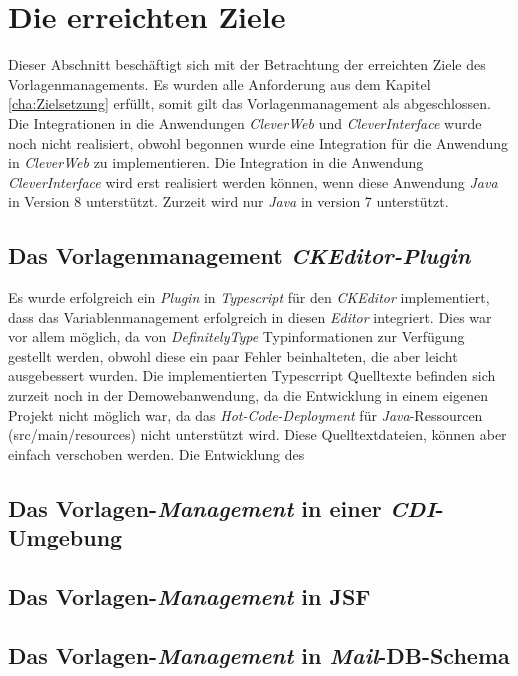 \section{Die erreichten Ziele}
Dieser Abschnitt beschäftigt sich mit der Betrachtung der erreichten Ziele des Vorlagenmanagements. Es wurden alle Anforderung aus dem Kapitel \ref{cha:Zielsetzung} erfüllt, somit gilt das Vorlagenmanagement als abgeschlossen. Die Integrationen in die Anwendungen \emph{CleverWeb} und \emph{CleverInterface} wurde noch nicht realisiert, obwohl begonnen wurde eine Integration für die Anwendung in \emph{CleverWeb} zu implementieren. Die Integration in die Anwendung \emph{CleverInterface} wird erst realisiert werden können, wenn diese Anwendung \emph{Java} in Version 8 unterstützt. Zurzeit wird nur \emph{Java} in version 7 unterstützt. 

\subsection{Das Vorlagenmanagement \emph{CKEditor-Plugin}}
Es wurde erfolgreich ein \emph{Plugin} in \emph{Typescript} für den \emph{CKEditor} implementiert, dass das Variablenmanagement erfolgreich in diesen \emph{Editor} integriert. Dies war vor allem möglich, da von \emph{DefinitelyType} Typinformationen zur Verfügung gestellt werden, obwohl diese ein paar Fehler beinhalteten, die aber leicht ausgebessert wurden. Die implementierten Typescrript Quelltexte befinden sich zurzeit noch in der Demowebanwendung, da die Entwicklung in einem eigenen Projekt nicht möglich war, da das \emph{Hot-Code-Deployment} für \emph{Java}-Ressourcen (src/main/resources) nicht unterstützt wird. Diese Quelltextdateien, können aber einfach verschoben werden. Die Entwicklung des 

\subsection{Das Vorlagen-\emph{Management} in einer \emph{CDI}-Umgebung}

\subsection{Das Vorlagen-\emph{Management} in JSF}
\subsection{Das Vorlagen-\emph{Management} in \emph{Mail}-DB-Schema}

